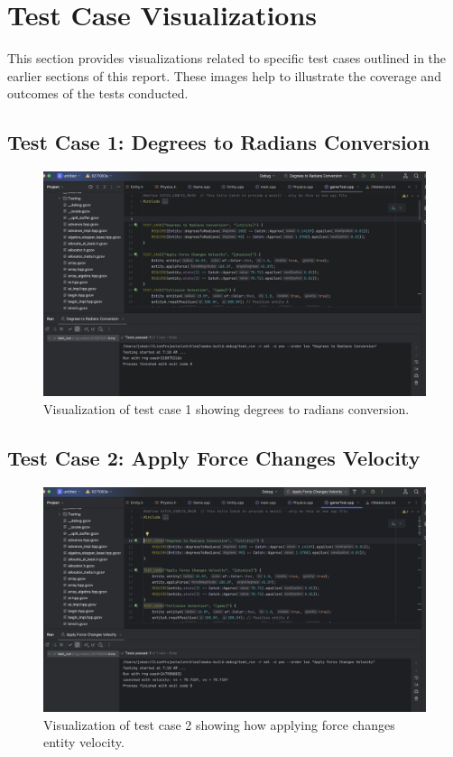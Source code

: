 \documentclass[12pt]{article}
\begin{document}
\FloatBarrier %

\section{Test Case Visualizations}

This section provides visualizations related to specific test cases outlined in the earlier sections of this report. These images help to illustrate the coverage and outcomes of the tests conducted.

\FloatBarrier
\subsection{Test Case 1: Degrees to Radians Conversion}

\begin{figure}[h!]
    \centering
    \includegraphics[width=\linewidth]{t1.png} %
    \caption{Visualization of test case 1 showing degrees to radians conversion.}
    \label{fig:test_case_1}
\end{figure}

\FloatBarrier
\subsection{Test Case 2: Apply Force Changes Velocity}

\begin{figure}[h!]
    \centering
    \includegraphics[width=\linewidth]{t2.png} %
    \caption{Visualization of test case 2 showing how applying force changes entity velocity.}
    \label{fig:test_case_2}
\end{figure}
\FloatBarrier
\end{document}
